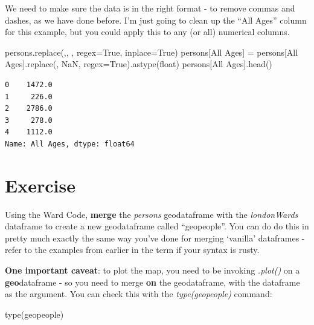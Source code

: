\documentclass[
  letterpaper,
  DIV=11,
  numbers=noendperiod]{scrreprt}
\newenvironment{Shaded}{\begin{snugshade}}{\end{snugshade}}
\newcommand{\BuiltInTok}[1]{\textcolor[rgb]{0.00,0.23,0.31}{#1}}
\newcommand{\NormalTok}[1]{\textcolor[rgb]{0.00,0.23,0.31}{#1}}
\newcommand{\OperatorTok}[1]{\textcolor[rgb]{0.37,0.37,0.37}{#1}}
\newcommand{\StringTok}[1]{\textcolor[rgb]{0.13,0.47,0.30}{#1}}
\newcommand{\VariableTok}[1]{\textcolor[rgb]{0.07,0.07,0.07}{#1}}
\begin{document}
We need to make sure the data is in the right format - to remove commas
and dashes, as we have done before. I'm just going to clean up the ``All
Ages'' column for this example, but you could apply this to any (or all)
numerical columns.

\begin{Shaded}
\begin{Highlighting}[]
\NormalTok{persons.replace(}\StringTok{\textquotesingle{},\textquotesingle{}}\NormalTok{, }\StringTok{\textquotesingle{}\textquotesingle{}}\NormalTok{, regex}\OperatorTok{=}\VariableTok{True}\NormalTok{, inplace}\OperatorTok{=}\VariableTok{True}\NormalTok{)}
\NormalTok{persons[}\StringTok{\textquotesingle{}All Ages\textquotesingle{}}\NormalTok{] }\OperatorTok{=}\NormalTok{ persons[}\StringTok{\textquotesingle{}All Ages\textquotesingle{}}\NormalTok{].replace(}\StringTok{\textquotesingle{}{-}\textquotesingle{}}\NormalTok{, }\StringTok{\textquotesingle{}NaN\textquotesingle{}}\NormalTok{, regex}\OperatorTok{=}\VariableTok{True}\NormalTok{).astype(}\StringTok{\textquotesingle{}float\textquotesingle{}}\NormalTok{)}
\NormalTok{persons[}\StringTok{\textquotesingle{}All Ages\textquotesingle{}}\NormalTok{].head()}
\end{Highlighting}
\end{Shaded}

\begin{verbatim}
0    1472.0
1     226.0
2    2786.0
3     278.0
4    1112.0
Name: All Ages, dtype: float64
\end{verbatim}

\hypertarget{exercise-21}{%
\section{Exercise}\label{exercise-21}}

Using the Ward Code, \textbf{merge} the \emph{persons} geodataframe with
the \emph{londonWards} dataframe to create a new geodataframe called
``geopeople''. You can do do this in pretty much exactly the same way
you've done for merging `vanilla' dataframes - refer to the examples
from earlier in the term if your syntax is rusty.

\textbf{One important caveat}: to plot the map, you need to be invoking
\emph{.plot()} on a \textbf{geo}dataframe - so you need to merge
\textbf{on} the geodataframe, with the dataframe as the argument. You
can check this with the \emph{type(geopeople)} command:

\begin{Shaded}
\begin{Highlighting}[]
\BuiltInTok{type}\NormalTok{(geopeople)}
\end{Highlighting}
\end{Shaded}
\end{document}
